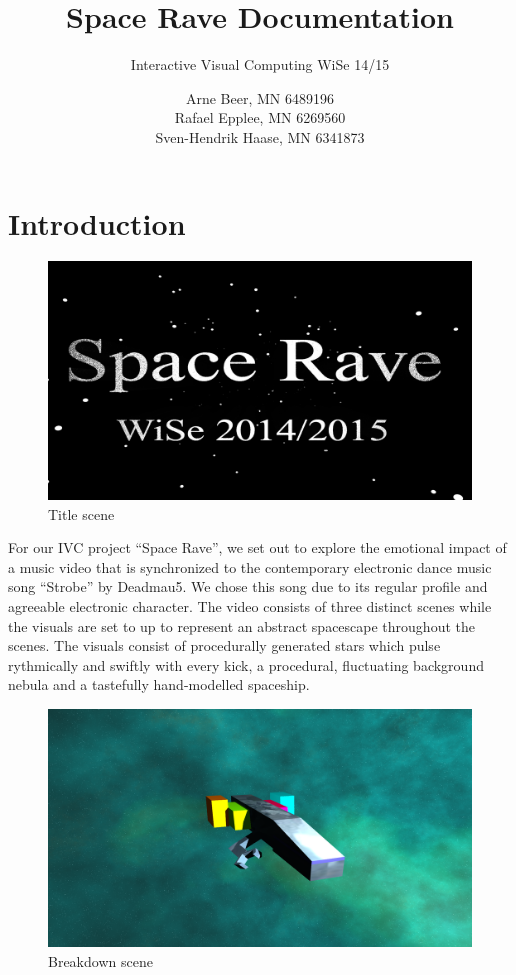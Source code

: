\documentclass[a4paper, 12pt]{scrartcl}
\title{Space Rave Documentation}
\subtitle{Interactive Visual Computing WiSe 14/15}
\author{Arne Beer, MN 6489196\\
        Rafael Epplee, MN 6269560\\
        Sven-Hendrik Haase, MN 6341873}
\begin{document}
\maketitle \section{Introduction}

    \begin{figure}[H]
        \centering
        \includegraphics[scale=0.23]{render_title}
        \caption{Title scene}
        \label{fig:title}
    \end{figure}

    For our IVC project ``Space Rave'', we set out to explore the emotional impact of a music video
    that is synchronized to the contemporary electronic dance music song ``Strobe'' by Deadmau5. We
    chose this song due to its regular profile and agreeable electronic character.  The video
    consists of three distinct scenes while the visuals are set to up to represent an abstract
    spacescape throughout the scenes. The visuals consist of procedurally generated stars which
    pulse rythmically and swiftly with every kick, a procedural, fluctuating background nebula and
    a tastefully hand-modelled spaceship.

    \begin{figure}[H]
        \centering
        \includegraphics[scale=0.23]{render_breakdown}
        \caption{Breakdown scene}
        \label{fig:breakdown}
    \end{figure}
\end{document}
